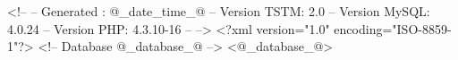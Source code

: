 <!--
-- Generated : @_date_time_@
-- Version TSTM: 2.0
-- Version MySQL: 4.0.24
-- Version PHP: 4.3.10-16
-- 
-->
<?xml version="1.0" encoding="ISO-8859-1"?>
<!-- Database @_database_@ -->
<@_database_@>
